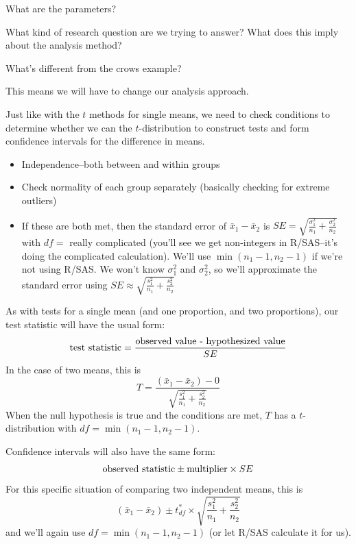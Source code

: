 \documentclass[
  letterpaper,
  DIV=11,
  numbers=noendperiod]{scrartcl}
\providecommand{\tightlist}{%
  \setlength{\itemsep}{0pt}\setlength{\parskip}{0pt}}\usepackage{longtable,booktabs,array}
\begin{document}
What are the parameters?

\hfill\break
\hfill\break
\hfill\break

What kind of research question are we trying to answer? What does this
imply about the analysis method?

\hfill\break
\hfill\break
\hfill\break
\hfill\break
\hfill\break

What's different from the crows example?

\hfill\break
\hfill\break
\hfill\break
\hfill\break

This means we will have to change our analysis approach.

Just like with the \(t\) methods for single means, we need to check
conditions to determine whether we can the \(t\)-distribution to
construct tests and form confidence intervals for the difference in
means.

\begin{itemize}
\tightlist
\item
  Independence--both between and within groups
\item
  Check normality of each group separately (basically checking for
  extreme outliers)
\item
  If these are both met, then the standard error of
  \(\bar x_1 - \bar x_2\) is
  \(SE = \sqrt{\frac{\sigma_1^2}{n_1} + \frac{\sigma^2_2}{n_2}}\) with
  \(df=\) really complicated (you'll see we get non-integers in
  R/SAS--it's doing the complicated calculation). We'll use
  \(\min(n_1-1, n_2-1)\) if we're not using R/SAS. We won't know
  \(\sigma^2_1\) and \(\sigma_2^2\), so we'll approximate the standard
  error using
  \(SE \approx \sqrt{\frac{s_1^2}{n_1} + \frac{s^2_2}{n_2}}\)
\end{itemize}

\hfill\break
\hfill\break
\hfill\break

\newpage

As with tests for a single mean (and one proportion, and two
proportions), our test statistic will have the usual form: \[
\hbox{test statistic} = \frac{\hbox{observed value - hypothesized value}}{SE}
\] In the case of two means, this is \[
T = \frac{(\bar x_1 - \bar x_2) - 0}{\sqrt{\frac{s_1^2}{n_1} + \frac{s_2^2}{n_2}}}
\] When the null hypothesis is true and the conditions are met, \(T\)
has a \(t\)-distribution with \(df=\min(n_1-1,n_2-1)\).

Confidence intervals will also have the same form: \[
\hbox{observed statistic} \pm \hbox{multiplier} \times SE
\] For this specific situation of comparing two independent means, this
is \[
(\bar x_1 - \bar x_2) \pm t^*_{df} \times \sqrt{\frac{s_1^2}{n_1} + \frac{s^2_2}{n_2}}
\] and we'll again use \(df=\min(n_1-1,n_2-1)\) (or let R/SAS calculate
it for us).
\end{document}

